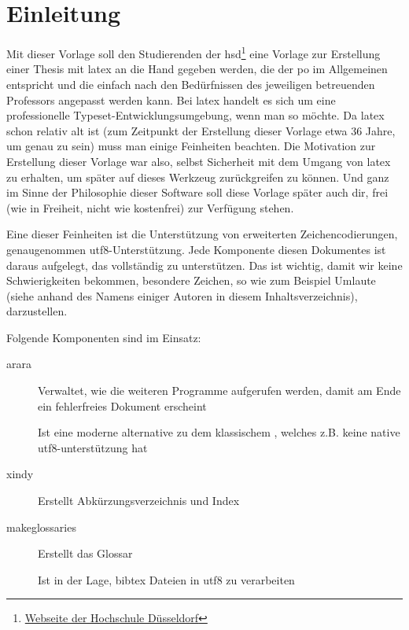 \newpage

\section{Einleitung}%
\label{sec:einl}
Mit dieser Vorlage soll den Studierenden der \gls{hsd}\footnote{\href{https://www.hs-duesseldorf.de}{Webseite der Hochschule Düsseldorf}} eine Vorlage zur Erstellung einer Thesis mit \gls{latex} an die Hand gegeben werden, die der \gls{po} im Allgemeinen entspricht und die einfach nach den Bedürfnissen des jeweiligen betreuenden Professors angepasst werden kann. Bei \gls{latex} handelt es sich um eine \glqq professionelle Typeset-Entwicklungsumgebung\grqq, wenn man so möchte. Da \gls{latex} schon
relativ alt ist (zum Zeitpunkt der Erstellung dieser Vorlage etwa 36 Jahre, um genau zu sein) muss man einige Feinheiten beachten. Die Motivation zur Erstellung dieser Vorlage war also, selbst Sicherheit mit dem Umgang von \gls{latex} zu erhalten, um später auf dieses Werkzeug zurückgreifen zu können. Und ganz im Sinne der Philosophie dieser Software soll diese Vorlage später auch dir, frei (wie in Freiheit, nicht wie kostenfrei) zur Verfügung stehen.

Eine dieser Feinheiten ist die Unterstützung von erweiterten Zeichencodierungen, genaugenommen \gls{utf8}-Unterstützung.
Jede Komponente diesen Dokumentes ist daraus aufgelegt, das vollständig zu unterstützen. Das ist wichtig, damit wir keine Schwierigkeiten bekommen, \glqq besondere Zeichen\grqq, so wie zum Beispiel Umlaute (siehe anhand des Namens einiger Autoren in diesem Inhaltsverzeichnis), darzustellen.

Folgende Komponenten sind im Einsatz:
\begin{description}
  \item[arara] Verwaltet, wie die weiteren Programme aufgerufen werden, damit am Ende ein fehlerfreies Dokument erscheint
  \item[\protect{}] Ist eine moderne alternative zu dem klassischem \glqq {}\grqq , welches z.B. keine native \gls{utf8}-unterstützung hat
  \item[xindy] Erstellt Abkürzungsverzeichnis und Index
  \item[makeglossaries] Erstellt das Glossar
  \item[\protect{}] Ist in der Lage, bibtex Dateien in \gls{utf8} zu verarbeiten
\end{description}

